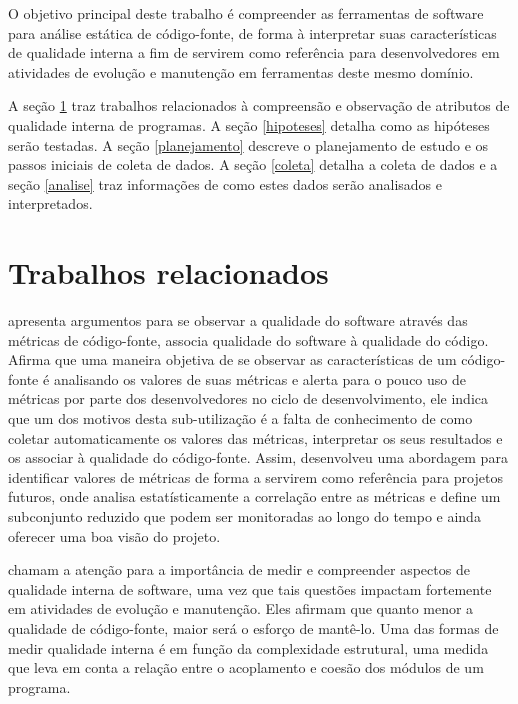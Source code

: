  \label{metodologia}

O objetivo principal deste trabalho é compreender as ferramentas de software
para análise estática de código-fonte, de forma à interpretar suas
características de qualidade interna a fim de servirem como referência para
desenvolvedores em atividades de evolução e manutenção em ferramentas deste
mesmo domínio.

A seção \ref{trabalhos-relacionados} traz trabalhos relacionados à compreensão
e observação de atributos de qualidade interna de programas. A seção
\ref{hipoteses} detalha como as hipóteses serão testadas. A seção
\ref{planejamento} descreve o planejamento de estudo e os passos iniciais de
coleta de dados. A seção \ref{coleta} detalha a coleta de dados e a seção
\ref{analise} traz informações de como estes dados serão analisados e
interpretados.

\section{Trabalhos relacionados} \label{trabalhos-relacionados}

 apresenta argumentos para se observar a qualidade
do software através das métricas de código-fonte, associa qualidade do
software à qualidade do código. Afirma que uma maneira objetiva de se observar
as características de um código-fonte é analisando os valores de suas métricas
e alerta para o pouco uso de métricas por parte dos desenvolvedores no ciclo
de desenvolvimento, ele indica que um dos motivos desta sub-utilização
é a falta de conhecimento de como coletar automaticamente
os valores das métricas, interpretar os seus resultados e os associar à
qualidade do código-fonte. Assim, desenvolveu uma abordagem para identificar
valores de métricas de forma a servirem como referência para projetos futuros,
onde analisa estatísticamente a correlação entre as métricas e define um
subconjunto reduzido que podem ser monitoradas ao longo do tempo e
ainda oferecer uma boa visão do projeto.

 chamam a atenção para a importância de medir e
compreender aspectos de qualidade interna de software, uma vez que tais
questões impactam fortemente em atividades de evolução e manutenção. Eles
afirmam que quanto menor a qualidade de código-fonte, maior será o esforço de
mantê-lo. Uma das formas de medir qualidade interna é em função da
complexidade estrutural, uma medida que leva em conta a relação entre o
acoplamento e coesão dos módulos de um programa.

